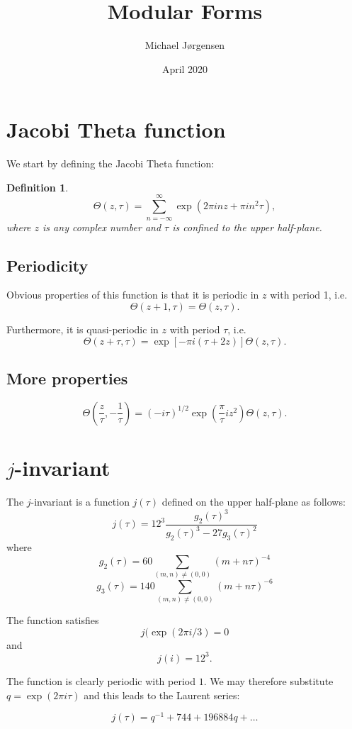 \documentclass[12pt,oneside,a4paper]{article}
\title{Modular Forms}
\date{April 2020}
\author{Michael Jørgensen}
\newtheorem{mydef}[thm]{Definition}
\begin{document}
\maketitle
\section{Jacobi Theta function}
We start by defining the Jacobi Theta function:

\begin{mydef}
$$
\Theta(z, \tau) = \sum_{n=-\infty}^{\infty} \exp(2\pi inz + \pi i n^2 \tau),
$$
where $z$ is any complex number and $\tau$ is confined to the upper
half-plane.
\end{mydef}

\subsection{Periodicity}

Obvious properties of this function is that it is periodic in $z$ with period 1, i.e.
$$
\Theta(z+1, \tau) = \Theta(z, \tau).
$$

Furthermore, it is quasi-periodic in $z$ with period $\tau$, i.e.
$$
\Theta(z+\tau, \tau) = \exp[-\pi i (\tau + 2z)] \Theta(z, \tau).
$$

\subsection{More properties}
$$
\Theta\left(\frac{z}{\tau}, -\frac{1}{\tau}\right) = (-i\tau)^{1/2} \exp(\frac{\pi}{\tau}iz^2) \Theta(z, \tau).
$$

\section{$j$-invariant}
The $j$-invariant is a function $j(\tau)$ defined on the upper half-plane as follows:
$$
j(\tau) = 12^3 \frac{g_2(\tau)^3}{g_2(\tau)^3 - 27 g_3(\tau)^2}
$$
where
$$
g_2(\tau) = 60 \sum_{(m,n)\neq(0,0)} (m+n\tau)^{-4}
$$
$$
g_3(\tau) = 140 \sum_{(m,n)\neq(0,0)} (m+n\tau)^{-6}
$$

The function satisfies
$$
j(\exp(2\pi i/3) = 0
$$
and
$$
j(i) = 12^3.
$$

The function is clearly periodic with period $1$. We may therefore substitute
$q=\exp(2\pi i \tau)$ and this leads to the Laurent series:

$$
j(\tau) = q^{-1} + 744 + 196884q + \ldots
$$
\end{document}
